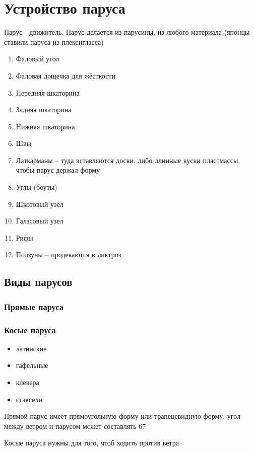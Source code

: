 \documentclass{article}        %
\begin{document}

\section{Устройство паруса}          
Парус---движитель. Парус делается из парусины, из любого материала (японцы ставили паруса из плексигласса)

\begin{enumerate}
	\item Фаловый угол 
	\item Фаловая дощечка для жёсткости 
	\item Передняя шкаторина
	\item Задняя шкаторина
	\item Нижняя шкаторина
	\item Швы
	\item Латкарманы -- туда вставляются доски, либо длинные куски пластмассы, чтобы парус держал форму
	\item Углы (боуты)
	\item Шкотовый узел
	\item Галзсовый узел
	\item Рифы
	\item Ползуны -- продеваются в ликтроз
\end{enumerate}

\subsection{Виды парусов}
\subsubsection{Прямые паруса}
\subsubsection{Косые паруса}
\begin{itemize}
	\item латинские
	\item гафельные
	\item клевера
	\item стаксели
\end{itemize}

Прямой парус имеет прямоугольную форму или трапецевидную форму, угол между ветром и парусом может составлять 67\degree 

Косые паруса нужны для того, чтоб ходить против ветра
\end{document}
